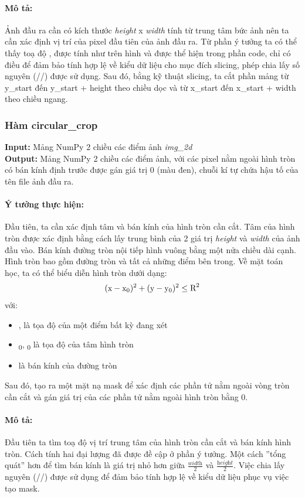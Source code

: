 \documentclass[]{article}
\begin{document}
\paragraph{Mô tả:} Ảnh đầu ra cần có kích thước \textit{height} x \textit{width} tính từ trung tâm bức ảnh  nên ta cần xác định vị trí của pixel đầu tiên của ảnh đầu ra. Từ phần ý tưởng ta có thể thấy toạ độ ,  được tính như trên hình và được thể hiện trong phần code, chỉ có điều để đảm bảo tính hợp lệ về kiểu dữ liệu cho mục đích slicing, phép chia lấy số nguyên (//) được sử dụng. Sau đó, bằng kỹ thuật slicing, ta cắt phần mảng từ y\_start đến y\_start + height theo chiều dọc và từ x\_start đến x\_start + width theo chiều ngang.

\subsubsection{Hàm circular\_crop}
\textbf{Input:} Mảng NumPy 2 chiều các điểm ảnh \textit{img\_2d} \\
\textbf{Output:} Mảng NumPy 2 chiều các điểm ảnh, với các pixel nằm ngoài hình tròn có bán kính định trước được gán giá trị 0 (màu đen), chuỗi kí tự chứa hậu tố của tên file ảnh đầu ra.
\paragraph{Ý tưởng thực hiện:} Đầu tiên, ta cần xác định tâm và bán kính của hình tròn cần cắt. Tâm của hình tròn được xác định bằng cách lấy trung bình của 2 giá trị \textit{height} và \textit{width} của ảnh đầu vào. Bán kính đường tròn nội tiếp hình vuông bằng một nửa chiều dài cạnh. Hình tròn bao gồm đường tròn và tất cả những điểm bên trong. Về mặt toán học, ta có thể biểu diễn hình tròn dưới dạng:
\[ (\text{x} - \text{x}\textsubscript 0)^2 + (\text{y} - \text{y}\textsubscript 0)^2 \leq \text{R}^2\]
với: 
\begin{itemize}
  \item {},  là tọa độ của một điểm bất kỳ đang xét
  \item {}\textsubscript 0, \textsubscript 0 là tọa độ của tâm hình tròn
  \item {} là bán kính của đường tròn
\end{itemize}
Sau đó, tạo ra một mặt nạ mask để xác định các phần tử nằm ngoài vòng tròn cần cắt và gán giá trị của các phần tử nằm ngoài hình tròn bằng 0.
\paragraph{Mô tả:} Đầu tiên ta tìm toạ độ vị trí trung tâm của hình tròn cần cắt và bán kính hình tròn. Cách tính hai đại lượng đã được đề cập ở phần ý tưởng. Một cách ''tổng quát'' hơn để tìm bán kính là giá trị nhỏ hơn giữa $\frac{\textit{width}}{2}$ và $\frac{\textit{height}}{2}$. Việc chia lấy nguyên (//) được sử dụng để đảm bảo tính hợp lệ về kiểu dữ liệu phục vụ việc tạo mask.
\end{document}
